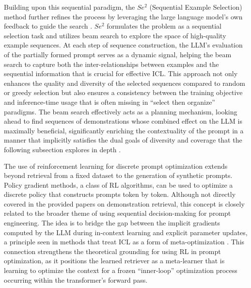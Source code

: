 \documentclass[11pt]{article}
\begin{document}
Building upon this sequential paradigm, the \(Se^2\) (Sequential Example Selection) method further refines the process by leveraging the large language model's own feedback to guide the search \cite{ref133}. \(Se^2\) formulates the problem as a sequential selection task and utilizes beam search to explore the space of high-quality example sequences. At each step of sequence construction, the LLM's evaluation of the partially formed prompt serves as a dynamic signal, helping the beam search to capture both the inter-relationships between examples and the sequential information that is crucial for effective ICL. This approach not only enhances the quality and diversity of the selected sequences compared to random or greedy selection but also ensures a consistency between the training objective and inference-time usage that is often missing in ``select then organize'' paradigms. The beam search effectively acts as a planning mechanism, looking ahead to find sequences of demonstrations whose combined effect on the LLM is maximally beneficial, significantly enriching the contextuality of the prompt in a manner that implicitly satisfies the dual goals of diversity and coverage that the following subsection explores in depth \cite{ref133}.

The use of reinforcement learning for discrete prompt optimization extends beyond retrieval from a fixed dataset to the generation of synthetic prompts. Policy gradient methods, a class of RL algorithms, can be used to optimize a discrete policy that constructs prompts token by token. Although not directly covered in the provided papers on demonstration retrieval, this concept is closely related to the broader theme of using sequential decision-making for prompt engineering. The idea is to bridge the gap between the implicit gradients computed by the LLM during in-context learning and explicit parameter updates, a principle seen in methods that treat ICL as a form of meta-optimization \cite{ref134}. This connection strengthens the theoretical grounding for using RL in prompt optimization, as it positions the learned retriever as a meta-learner that is learning to optimize the context for a frozen ``inner-loop'' optimization process occurring within the transformer's forward pass.
\end{document}
